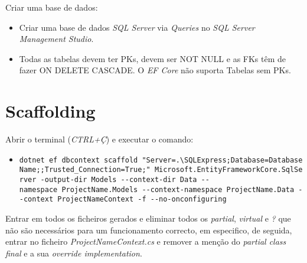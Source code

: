 Criar uma base de dados:

\begin{itemize}

  \item Criar uma base de dados \textit{SQL Server} via \textit{Queries} no \textit{SQL Server Management Studio}.
  \item Todas as tabelas devem ter PKs, devem ser NOT NULL e as FKs têm de fazer ON DELETE CASCADE. O \textit{EF Core} não suporta Tabelas sem PKs.
\end{itemize}

\section{Scaffolding}

Abrir o terminal (\textit{CTRL+Ç}) e executar o comando:

\begin{itemize}

  \item \texttt{dotnet\ ef\ dbcontext\ scaffold\ "Server=.\textbackslash{}SQLExpress;Database=DatabaseName;;Trusted\_Connection=True;"\ Microsoft.EntityFrameworkCore.SqlServer\ -output-dir\ Models\ -\/-context-dir\ Data\ -\/-namespace\ ProjectName.Models\ -\/-context-namespace\ ProjectName.Data\ -\/-context\ ProjectNameContext\ -f\ -\/-no-onconfiguring}
\end{itemize}

Entrar em todos os ficheiros gerados e eliminar todos os \textit{partial},
\textit{virtual} e \textit{?} que não são necessários para um funcionamento correcto, em especifico, de
seguida, entrar no ficheiro \textit{ProjectNameContext.cs} e remover a menção do
\textit{partial class final} e a sua \textit{override implementation}.
